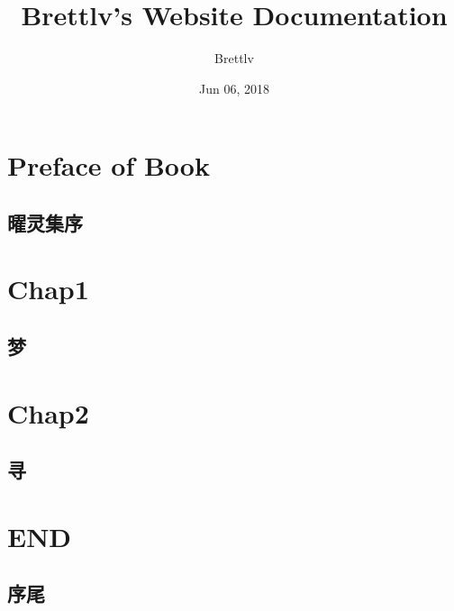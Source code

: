 \documentclass[letterpaper,10pt,english]{sphinxmanual}
\title{Brettlv's Website Documentation}
\date{Jun 06, 2018}
\author{Brettlv}
\begin{document}
\maketitle
\sphinxtableofcontents
{}\label{\detokenize{index::doc}}



\chapter{Preface of Book}
\label{\detokenize{Preface:toctree-directive}}\label{\detokenize{Preface:welcome-to-brett-s-blog}}\label{\detokenize{Preface:preface-of-book}}\label{\detokenize{Preface::doc}}

\section{曜灵集序}
\label{\detokenize{Preface:}}\label{\detokenize{Preface:id1}}

\chapter{Chap1}
\label{\detokenize{Chap1::doc}}\label{\detokenize{Chap1:chap1}}

\section{梦}
\label{\detokenize{Chap1:}}\label{\detokenize{Chap1:id1}}

\chapter{Chap2}
\label{\detokenize{Chap2:chap2}}\label{\detokenize{Chap2::doc}}

\section{寻}
\label{\detokenize{Chap2:}}\label{\detokenize{Chap2:id1}}

\chapter{END}
\label{\detokenize{END:end}}\label{\detokenize{END::doc}}

\section{序尾}
\label{\detokenize{END:}}\label{\detokenize{END:id1}}
\end{document}
